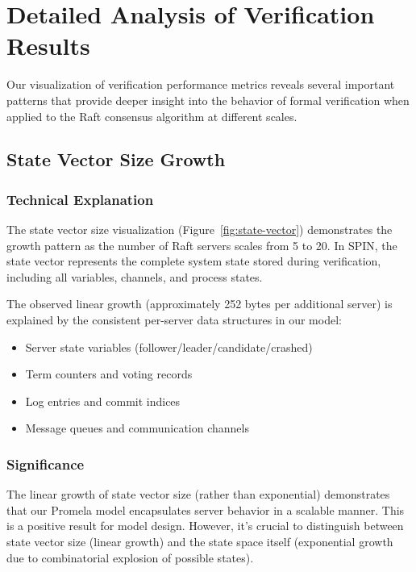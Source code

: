 
\section{Detailed Analysis of Verification Results}

Our visualization of verification performance metrics reveals several important patterns that provide deeper insight into the behavior of formal verification when applied to the Raft consensus algorithm at different scales.

\subsection{State Vector Size Growth}

\subsubsection{Technical Explanation}

The state vector size visualization (Figure~\ref{fig:state-vector}) demonstrates the growth pattern as the number of Raft servers scales from 5 to 20. In SPIN, the state vector represents the complete system state stored during verification, including all variables, channels, and process states.

The observed linear growth (approximately 252 bytes per additional server) is explained by the consistent per-server data structures in our model:
\begin{itemize}
    \item Server state variables (follower/leader/candidate/crashed)
    \item Term counters and voting records
    \item Log entries and commit indices
    \item Message queues and communication channels
\end{itemize}

\subsubsection{Significance}

The linear growth of state vector size (rather than exponential) demonstrates that our Promela model encapsulates server behavior in a scalable manner. This is a positive result for model design. However, it's crucial to distinguish between state vector size (linear growth) and the state space itself (exponential growth due to combinatorial explosion of possible states).

